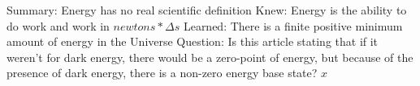 \documentclass[12pt]{article}
\begin{document}
Summary: \newline
\quad \qquad Energy has no real scientific definition  \newline
Knew: \newline
\quad \qquad Energy is the ability to do work and work in $ newtons * \Delta s $  \newline
Learned: \newline
\quad \qquad There is a finite positive minimum amount of energy in the Universe  \newline
Question: \newline
\quad \qquad Is this article stating that if it weren't for dark energy, there would be a zero-point of energy, but because of the presence of dark energy, there is a non-zero energy base state?   \newline
$x$ %
\end{document}
